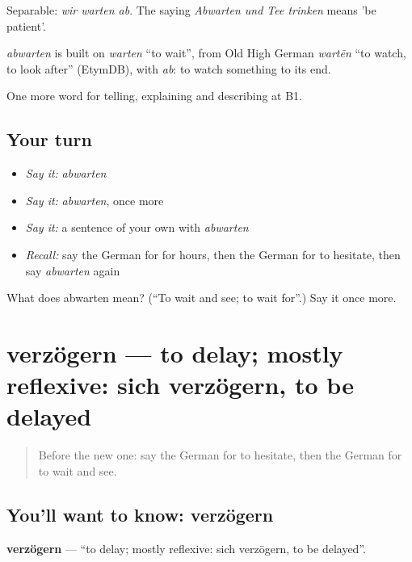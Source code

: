 Separable: \emph{wir warten ab}. The saying \emph{Abwarten und Tee trinken} means 'be patient'.

\begin{cousinweb}
\emph{abwarten} is built on \emph{warten} \textquotedblleft{}to wait\textquotedblright{}, from Old High German \emph{wartēn} \textquotedblleft{}to watch, to look after\textquotedblright{} (EtymDB), with \emph{ab}: to watch something to its end.
\end{cousinweb}

\begin{grammarlens}[title={What you've built}]
One more word for telling, explaining and describing at B1.
\end{grammarlens}

\subsection*{Your turn}
\begin{itemize}
\raggedright
  \item \emph{Say it:} \emph{abwarten}
  \item \emph{Say it:} \emph{abwarten}, once more
  \item \emph{Say it:} a sentence of your own with \emph{abwarten}
  \item \emph{Recall:} say the German for for hours, then the German for to hesitate, then say \emph{abwarten} again
\end{itemize}

\begin{tcolorbox}[breakable,colback=teal!4,colframe=teal!35!black,title={Before you move on}]
What does abwarten mean? (\textquotedblleft{}To wait and see; to wait for\textquotedblright{}.) Say it once more.
\end{tcolorbox}
\section[verzögern]{verzögern — to delay; mostly reflexive: sich verzögern, to be delayed}

\label{lesson:GE-C270-verzoegern}



\begin{quote}
Before the new one: say the German for to hesitate, then the German for to wait and see.
\end{quote}

\subsection*{You'll want to know: verzögern}
\textbf{verzögern} — \textquotedblleft{}to delay; mostly reflexive: sich verzögern, to be delayed\textquotedblright{}.

